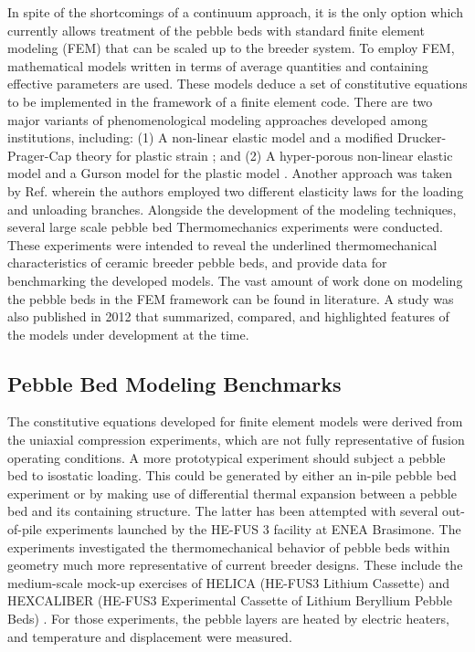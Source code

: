 In spite of the shortcomings of a continuum approach, it is the only option which currently allows treatment of the pebble beds with standard finite element modeling (FEM) that can be scaled up to the breeder system. To employ FEM, mathematical models written in terms of average quantities and containing effective parameters are used. These models deduce a set of constitutive equations to be implemented in the framework of a finite element code.  There are two major variants of phenomenological modeling approaches developed among institutions, including: (1) A non-linear elastic model and a modified Drucker-Prager-Cap theory for plastic strain \cite{Gan2007189,Fokkens2003}; and (2) A hyper-porous non-linear elastic model and a Gurson model for the plastic model \cite{DellOrco:2007hc,DellOrco:2010zr,DiMaio20081287}. Another approach was taken by Ref.\cite{Fokkens2003} wherein the authors employed two different elasticity laws for the loading and unloading branches. Alongside the development of the modeling techniques, several large scale pebble bed Thermomechanics experiments were conducted. These experiments were intended to reveal the underlined thermomechanical characteristics of ceramic breeder pebble beds, and provide data for benchmarking the developed models. The vast amount of work done on modeling the pebble beds in the FEM framework can be found in literature. \cite{DellOrco:2007hc,DellOrco:2010zr,DiMaio20101234,Gan2007189,Gan2007189,Gan:2009vn,Gan:2010lh,Gan:2010kc,DellOrco:2007hc,DellOrco:2010zr,DiMaio20101234,Gan2007189,DellOrco:2007hc,DiMaio20101234} A study was also published in 2012 that summarized, compared, and highlighted features of the models under development at the time.\cite{ying2011isfnt}



\subsection{Pebble Bed Modeling Benchmarks}

The constitutive equations developed for finite element models were derived from the uniaxial compression experiments, which are not fully representative of fusion operating conditions. A more prototypical experiment should subject a pebble bed to isostatic loading. This could be generated by either an in-pile pebble bed experiment or by making use of differential thermal expansion between a pebble bed and its containing structure. The latter has been attempted with several out-of-pile experiments launched by the HE-FUS 3 facility at ENEA Brasimone. The experiments investigated the thermomechanical behavior of pebble beds within geometry much more representative of current breeder designs. These include the medium-scale mock-up exercises of HELICA (HE-FUS3 Lithium Cassette) and HEXCALIBER (HE-FUS3 Experimental Cassette of Lithium Beryllium Pebble Beds) \cite{dellorco:2006,DiMaio20081287}. For those experiments, the pebble layers are heated by electric heaters, and temperature and displacement were measured.

